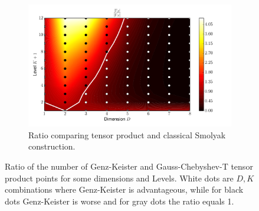 \documentclass[a4paper,10pt]{article}
\begin{document}
\begin{figure}
\begin{subfigure}[b]{\linewidth}
    \centering
    \includegraphics[width=0.8\linewidth]{./img/smol_chebyshevt_ratio.pdf}
    \caption{Ratio comparing tensor product and classical Smolyak construction.}
    \label{fig:smol_chebyshevt_ratio}
  \end{subfigure}
  \caption{Ratio of the number of Genz-Keister and Gauss-Chebyshev-T tensor product
  points for some dimensions and Levels.
  White dots are $D,K$ combinations where Genz-Keister is advantageous,
  while for black dots Genz-Keister is worse and for gray dots the ratio equals 1.}
\end{figure}
\end{document}
